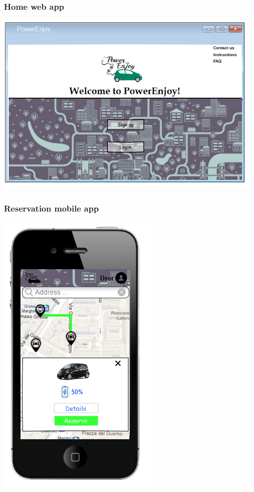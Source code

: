 \clearpage
\subsubsection{Home web app}
\begin{center}
\includegraphics[]{../images/mookup/homepage_web}
\end{center}

\clearpage
\subsubsection{Reservation mobile app}
\begin{center}
\includegraphics[]{../images/mookup/Reservation_mobile}
\end{center}

